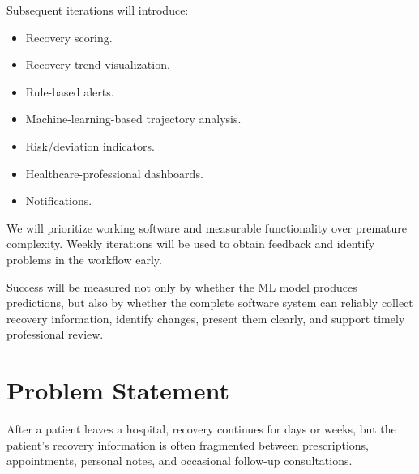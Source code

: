 \documentclass[11pt,a4paper]{article}
\begin{document}
Subsequent iterations will introduce:
\begin{itemize}[leftmargin=0.7cm]
    \item Recovery scoring.
    \item Recovery trend visualization.
    \item Rule-based alerts.
    \item Machine-learning-based trajectory analysis.
    \item Risk/deviation indicators.
    \item Healthcare-professional dashboards.
    \item Notifications.
\end{itemize}

We will prioritize working software and measurable
functionality over premature complexity. Weekly iterations will be used to
obtain feedback and identify problems in the workflow early.

Success will be measured not only by whether the ML model
produces predictions, but also by whether the complete software system can
reliably collect recovery information, identify changes, present them clearly,
and support timely professional review.

\section{Problem Statement}

After a patient leaves a hospital, recovery continues for
days or weeks, but the patient's recovery information is often fragmented
between prescriptions, appointments, personal notes, and occasional follow-up
consultations.
\end{document}
